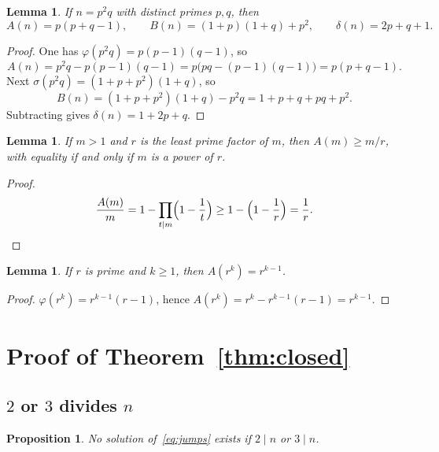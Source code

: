 \documentclass[11pt,reqno]{amsart}
\newcommand{\ph}{\varphi}
\newcommand{\sig}{\sigma}
\newtheorem{lemma}[theorem]{Lemma}
\newtheorem{proposition}[theorem]{Proposition}
\theoremstyle{definition}
\begin{document}
\begin{lemma}
\label{lem:AB}
If \(n=p^2q\) with distinct primes \(p,q\), then
\begin{equation}
\label{eq:An}
A(n)=p(p+q-1),\qquad
B(n)=(1+p)(1+q)+p^2,\qquad
\delta(n)=2p+q+1.
\end{equation}
\end{lemma}

\begin{proof}
One has \(\ph(p^2q)=p(p-1)(q-1)\), so
\[
A(n)=p^2q-p(p-1)(q-1)=p\bigl(pq-(p-1)(q-1)\bigr)=p(p+q-1).
\]
Next \(\sig(p^2q)=(1+p+p^2)(1+q)\), so
\[
B(n)=(1+p+p^2)(1+q)-p^2q=1+p+q+pq+p^2.
\]
Subtracting gives \(\delta(n)=1+2p+q\).
\end{proof}

\begin{lemma}
\label{lem:cot}
If \(m>1\) and \(r\) is the least prime factor of \(m\), then \(A(m)\ge m/r\), with equality if and only if \(m\) is a power of \(r\).
\end{lemma}

\begin{proof}
\[
\frac{A(m)}{m}=1-\prod_{t\mid m}\Bigl(1-\frac{1}{t}\Bigr)\ge 1-\Bigl(1-\frac{1}{r}\Bigr)=\frac{1}{r}.
\]
\end{proof}

\begin{lemma}
\label{lem:Ark}
If \(r\) is prime and \(k\ge 1\), then \(A(r^k)=r^{k-1}\).
\end{lemma}

\begin{proof}
\(\ph(r^k)=r^{k-1}(r-1)\), hence \(A(r^k)=r^k-r^{k-1}(r-1)=r^{k-1}\).
\end{proof}

\section{Proof of Theorem~\ref{thm:closed}}
\label{sec:proof1}

\subsection{\(2\) or \(3\) divides \(n\)}

\begin{proposition}
\label{prop:23}
No solution of~\eqref{eq:jumps} exists if \(2\mid n\) or \(3\mid n\).
\end{proposition}
\end{document}
